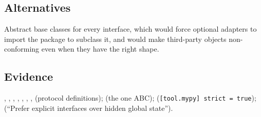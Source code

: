 \subsection*{Alternatives}

Abstract base classes for every interface, which would force optional adapters
to import the package to subclass it, and would make third-party objects
non-conforming even when they have the right shape.

\subsection*{Evidence}

,
, , ,
, , ,
 (protocol definitions);
 (the one ABC);
 (\texttt{[tool.mypy] strict = true});
 (``Prefer explicit interfaces over hidden global state'').

